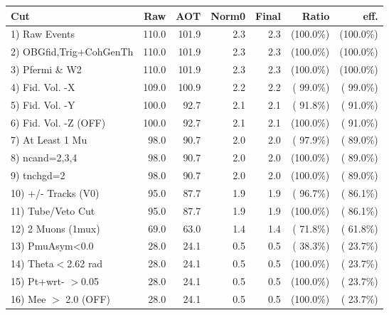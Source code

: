  \begin{table}[h!]\centering
 \begin{tabular}{||l||r|r|r|r|r|r||}
 \hline
 \hline
 Cut & Raw & AOT & Norm0 & Final & Ratio & eff.       \\
 \hline
  1) Raw Events           &        110.0 &        101.9 &          2.3 &          2.3 & (100.0\%) & (100.0\%) \\
  2) OBGfid,Trig+CohGenTh &        110.0 &        101.9 &          2.3 &          2.3 & (100.0\%) & (100.0\%) \\
  3) Pfermi \& W2         &        110.0 &        101.9 &          2.3 &          2.3 & (100.0\%) & (100.0\%) \\
  4) Fid. Vol. -X         &        109.0 &        100.9 &          2.2 &          2.2 & ( 99.0\%) & ( 99.0\%) \\
  5) Fid. Vol. -Y         &        100.0 &         92.7 &          2.1 &          2.1 & ( 91.8\%) & ( 91.0\%) \\
  6) Fid. Vol. -Z (OFF)   &        100.0 &         92.7 &          2.1 &          2.1 & (100.0\%) & ( 91.0\%) \\
  7) At Least 1 Mu        &         98.0 &         90.7 &          2.0 &          2.0 & ( 97.9\%) & ( 89.0\%) \\
  8) ncand=2,3,4          &         98.0 &         90.7 &          2.0 &          2.0 & (100.0\%) & ( 89.0\%) \\
  9) tnchgd=2             &         98.0 &         90.7 &          2.0 &          2.0 & (100.0\%) & ( 89.0\%) \\
 10) +/- Tracks (V0)      &         95.0 &         87.7 &          1.9 &          1.9 & ( 96.7\%) & ( 86.1\%) \\
 11) Tube/Veto Cut        &         95.0 &         87.7 &          1.9 &          1.9 & (100.0\%) & ( 86.1\%) \\
 12) 2 Muons (1mux)       &         69.0 &         63.0 &          1.4 &          1.4 & ( 71.8\%) & ( 61.8\%) \\
 13) PmuAsym<0.0          &         28.0 &         24.1 &          0.5 &          0.5 & ( 38.3\%) & ( 23.7\%) \\
 14) Theta$<$2.62 rad     &         28.0 &         24.1 &          0.5 &          0.5 & (100.0\%) & ( 23.7\%) \\
 15) Pt+wrt- $>$0.05      &         28.0 &         24.1 &          0.5 &          0.5 & (100.0\%) & ( 23.7\%) \\
 16) Mee $>$ 2.0  (OFF)   &         28.0 &         24.1 &          0.5 &          0.5 & (100.0\%) & ( 23.7\%) \\

\end{tabular}
\end{table}
